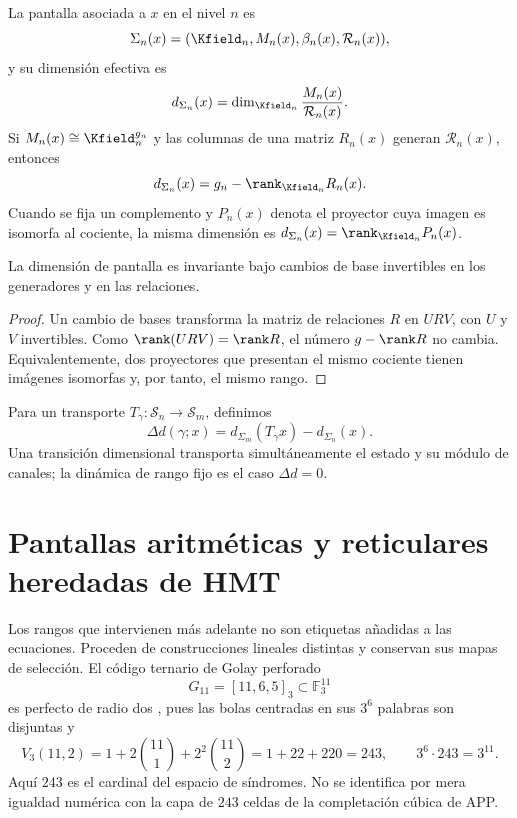 \begin{definition}
La pantalla asociada a \(x\) en el nivel \(n\) es
\[
 \Sigma_n(x)=
 (\Kfield_n,M_n(x),\beta_n(x),\mathcal R_n(x)),
\]
y su dimensión efectiva es
\[
 d_{\Sigma_n}(x)=
 \dim_{\Kfield_n}\frac{M_n(x)}{\mathcal R_n(x)}.
\]
Si \(M_n(x)\cong\Kfield_n^{g_n}\) y las columnas de una matriz
\(R_n(x)\) generan \(\mathcal R_n(x)\), entonces
\[
 d_{\Sigma_n}(x)=g_n-\rank_{\Kfield_n}R_n(x).
\]
Cuando se fija un complemento y \(P_n(x)\) denota el proyector cuya imagen es
isomorfa al cociente, la misma dimensión es
\(d_{\Sigma_n}(x)=\rank_{\Kfield_n}P_n(x)\).
\end{definition}

\begin{proposition}
La dimensión de pantalla es invariante bajo cambios de base invertibles en
los generadores y en las relaciones.
\end{proposition}
\begin{proof}
Un cambio de bases transforma la matriz de relaciones \(R\) en \(URV\), con
\(U\) y \(V\) invertibles. Como \(\rank(URV)=\rank R\), el número
\(g-\rank R\) no cambia. Equivalentemente, dos proyectores que presentan el
mismo cociente tienen imágenes isomorfas y, por tanto, el mismo rango.
\end{proof}

Para un transporte \(T_\gamma:\mathcal S_n\to\mathcal S_m\), definimos
\[
 \Delta d(\gamma;x)=
 d_{\Sigma_m}(T_\gamma x)-d_{\Sigma_n}(x).
\]
Una transición dimensional transporta simultáneamente el estado y su módulo
de canales; la dinámica de rango fijo es el caso \(\Delta d=0\).

\section{Pantallas aritméticas y reticulares heredadas de HMT}

Los rangos que intervienen más adelante no son etiquetas añadidas a las
ecuaciones. Proceden de construcciones lineales distintas y conservan sus
mapas de selección. El código ternario de Golay perforado
\[
 G_{11}=[11,6,5]_3\subset\mathbb F_3^{11}
\]
es perfecto de radio dos \cite{MacWilliamsSloane1977}, pues las bolas
centradas en sus \(3^6\) palabras son
disjuntas y
\[
 V_3(11,2)=1+2\binom{11}{1}+2^2\binom{11}{2}
 =1+22+220=243,
\qquad
 3^6\cdot243=3^{11}.
\]
Aquí \(243\) es el cardinal del espacio de síndromes. No se identifica por
mera igualdad numérica con la capa de \(243\) celdas de la completación
cúbica de APP\@.


